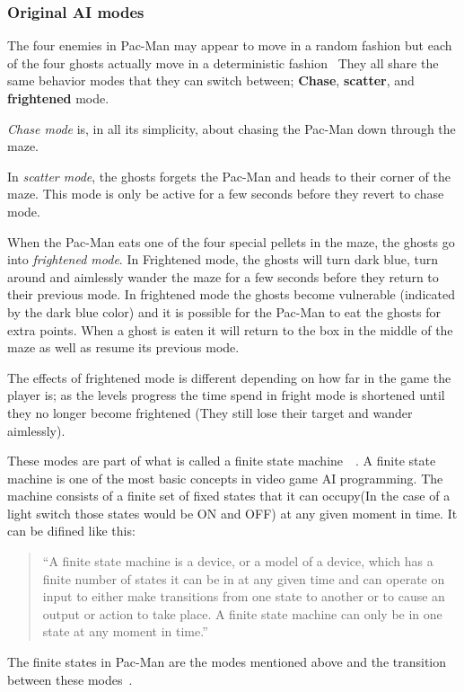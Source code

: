
\subsubsection{Original AI modes}
The four enemies in Pac-Man may appear to move in a random fashion but each of the four ghosts actually move in a deterministic fashion~\autocite{Pittman2011} They all share the same behavior modes that they can switch between; \textbf{Chase}, \textbf{scatter}, and \textbf{frightened} mode.

\emph{Chase mode} is, in all its simplicity, about chasing the Pac-Man down through the maze.

In \emph{scatter mode}, the ghosts forgets the Pac-Man and heads to their corner of the maze. This mode is only be active for a few seconds before they revert to chase mode.

When the Pac-Man eats one of the four special pellets in the maze, the ghosts go into \emph{frightened mode}. In Frightened mode, the ghosts will turn dark blue, turn around and aimlessly wander the maze for a few seconds before they return to their previous mode. In frightened mode the ghosts become vulnerable (indicated by the dark blue color) and it is possible for the Pac-Man to eat the ghosts for extra points. When a ghost is eaten it will return to the box in the middle of the maze as well as resume its previous mode.

The effects of frightened mode is different depending on how far in the game the player is; as the levels progress the time spend in fright mode is shortened until they no longer become frightened (They still lose their target and wander aimlessly).

These modes are part of what is called a finite state machine~\autocite[pp.44]{Buckland2005}~\autocite{Kehoe2009}.
A finite state machine is one of the most basic concepts in video game AI programming. The machine consists of a finite set of fixed states that it can occupy(In the case of a light switch those states would be ON and OFF) at any given moment in time. It can be difined like this:

\blockquote[\autocite{Buckland2005}]{\enquote{A finite state machine is a device, or a model of a device, which has a finite number of states it can be in at any given time and can operate on input to either make transitions from one state to another or to cause an output or action to take place. A finite state machine can only be in one state at any moment in time.}}

The finite states in Pac-Man are the modes mentioned above and the transition between these modes~\autocite[pp.45]{Buckland2005}.